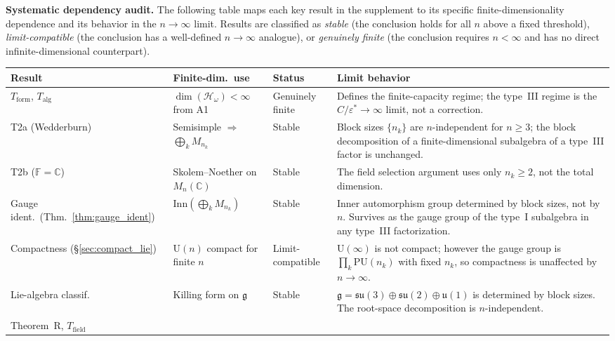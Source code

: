 \documentclass[11pt,a4paper]{article}
\theoremstyle{definition}
\newcommand{\eps}{\varepsilon}
\begin{document}
\smallskip\noindent\textbf{Systematic dependency audit.}\quad
The following table maps each key result in the supplement to its
specific finite-dimensionality dependence and its behavior in the
$n \to \infty$ limit.  Results are classified as \textit{stable}
(the conclusion holds for all $n$ above a fixed threshold),
\textit{limit-compatible} (the conclusion has a well-defined
$n \to \infty$ analogue), or \textit{genuinely finite}
(the conclusion requires $n < \infty$ and has no direct
infinite-dimensional counterpart).

\smallskip
\begin{center}\small
\renewcommand{\arraystretch}{1.2}
\begin{tabular}{@{}p{2.6cm}p{4.5cm}p{2.0cm}p{3.8cm}@{}}
\toprule
\textbf{Result} & \textbf{Finite-dim.\ use} & \textbf{Status} & \textbf{Limit behavior} \\
\midrule
$T_{\mathrm{form}}$, $T_{\mathrm{alg}}$ &
  $\dim(\mathcal{H}_\omega) < \infty$ from A1 &
  Genuinely finite &
  Defines the finite-capacity regime; the type~III regime is the $C/\eps^* \to \infty$ limit, not a correction. \\[2pt]
T2a (Wedderburn) &
  Semisimple $\Rightarrow$ $\bigoplus_k M_{n_k}$ &
  Stable &
  Block sizes $\{n_k\}$ are $n$-independent for $n \ge 3$; the block decomposition of a finite-dimensional subalgebra of a type~III factor is unchanged. \\[2pt]
T2b ($\mathbb{F} = \mathbb{C}$) &
  Skolem--Noether on $M_n(\mathbb{C})$ &
  Stable &
  The field selection argument uses only $n_k \ge 2$, not the total dimension. \\[2pt]
Gauge ident.\ (Thm.~\ref{thm:gauge_ident}) &
  $\mathrm{Inn}(\bigoplus_k M_{n_k})$ &
  Stable &
  Inner automorphism group determined by block sizes, not by $n$.  Survives as the gauge group of the type~I subalgebra in any type~III factorization. \\[2pt]
Compactness (\S\ref{sec:compact_lie}) &
  $\mathrm{U}(n)$ compact for finite $n$ &
  Limit-compatible &
  $\mathrm{U}(\infty)$ is not compact; however the gauge group is $\prod_k \mathrm{PU}(n_k)$ with fixed $n_k$, so compactness is unaffected by $n \to \infty$. \\[2pt]
Lie-algebra classif. &
  Killing form on $\mathfrak{g}$ &
  Stable &
  $\mathfrak{g} = \mathfrak{su}(3) \oplus \mathfrak{su}(2) \oplus \mathfrak{u}(1)$ is determined by block sizes.  The root-space decomposition is $n$-independent. \\[2pt]
Theorem~R, $T_{\mathrm{field}}$ &

\end{tabular}
\end{center}
\end{document}
